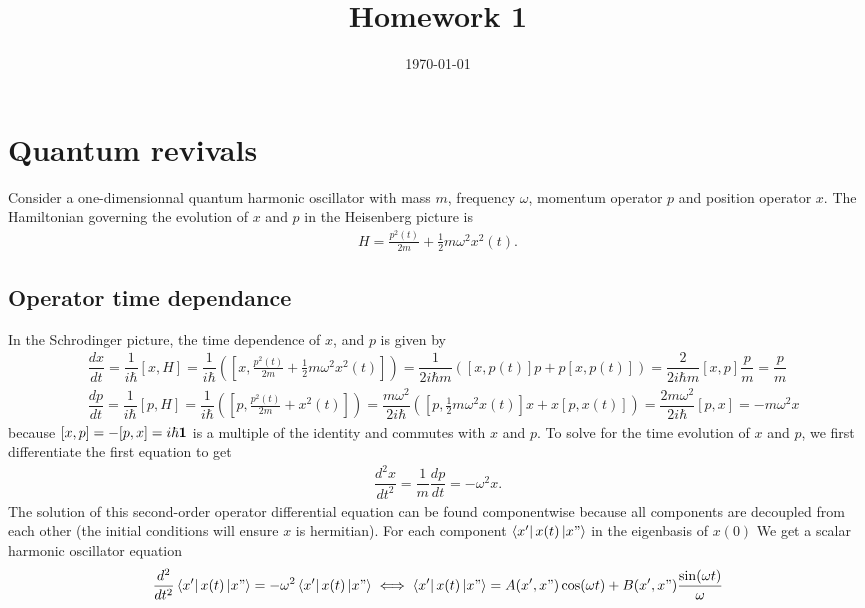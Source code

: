 \documentclass[10pt, a4paper]{article}
\title{Homework 1} %
\author{\PA} %
\date{\today} %
\begin{document}
\maketitlepage

\maketableofcontents

\section{Quantum revivals}
Consider a one-dimensionnal quantum harmonic oscillator with mass $m$, frequency $\omega$, momentum operator $p$ and position operator $x$. The Hamiltonian governing the evolution of $x$ and $p$ in the Heisenberg picture is
\begin{align*}
    H=\frac{p^2(t)}{2 m}+\frac{1}{2} m \omega^2 x^2(t).
\end{align*}
\subsection{Operator time dependance}
In the Schrodinger picture, the time dependence of $x$, and $p$ is given by 
\begin{align*}
    &\dfrac{dx}{dt} =\dfrac{1}{i\hbar}  [x, H] = \dfrac{1}{i\hbar} \left([x, \frac{p^2(t)}{2 m}+\frac{1}{2} m \omega^2 x^2(t)]\right) = \dfrac{1}{2i\hbar m} \left([x, p(t)]p + p[x, p(t)]\right) = \dfrac{2}{2 i\hbar m} [x, p]\dfrac{p}{m} = \dfrac{p}{m}  \\
    &\dfrac{dp}{dt} =\dfrac{1}{i\hbar}  [p, H] = \dfrac{1}{i\hbar} \left([p, \frac{p^2(t)}{2 m}+ x^2(t)]\right) = \dfrac{m \omega^2}{2i\hbar} \left([p, \frac{1}{2} m \omega^2 x(t)]x + x[p,  x(t)]\right) = \dfrac{2 m \omega^2}{2i\hbar} [p, x] = - m \omega^2 x
\end{align*}
because $[x, p] = -[p, x] = i\hbar \bf{1}$ is a multiple of the identity and commutes with $x$ and $p$. To solve for the time evolution of $x$ and $p$, we first differentiate the first equation to get 
\begin{align*}
    \dfrac{d^2 x}{dt^2} = \dfrac{1}{m} \dfrac{dp}{dt} =  -\omega^2 x. 
\end{align*}
The solution of this second-order operator differential equation can be found componentwise because all components are decoupled from each other (the initial conditions will ensure $x$ is hermitian). For each component $\bra{x'} x(t) \ket{x"}$ in the eigenbasis of $x(0)$ We get a scalar harmonic oscillator equation
\begin{align*}
    \dfrac{d^2}{dt^2} \bra{x'} x(t) \ket{x"} = -\omega^2 \bra{x'} x(t) \ket{x"} \iff \bra{x'} x(t) \ket{x"} = A(x', x") \cos(\omega t) +  B(x', x") \dfrac{\sin(\omega t)}{\omega}
\end{align*} 
\end{document}
